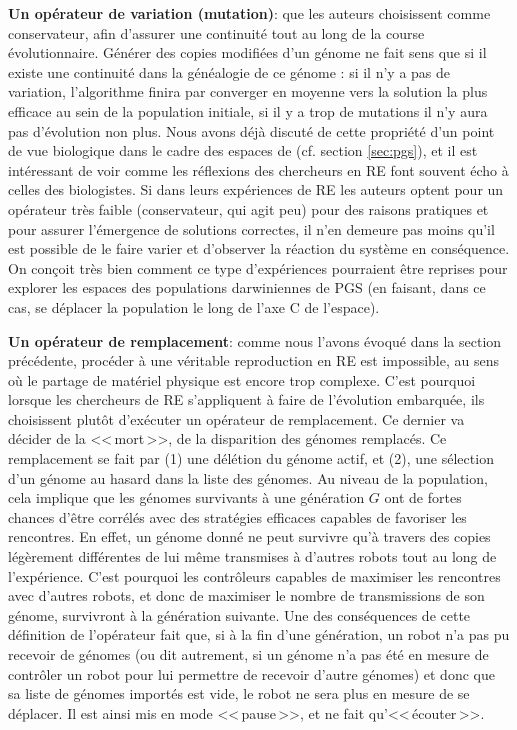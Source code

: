 \textbf{Un opérateur de variation (mutation)}: que les auteurs choisissent comme conservateur, afin d'assurer une continuité tout au long de la course évolutionnaire. Générer des copies modifiées d'un génome ne fait sens que si il existe une continuité dans la généalogie de ce génome : si il n'y a pas de variation, l'algorithme finira par converger en moyenne vers la solution la plus efficace au sein de la population initiale, si il y a trop de mutations il n'y aura pas d'évolution non plus. Nous avons déjà discuté de cette propriété d'un point de vue biologique dans le cadre des espaces de \cite{godfrey2009darwinian} (cf. section \ref{sec:pgs}), et il est intéressant de voir comme les réflexions des chercheurs en RE font souvent écho à celles des biologistes. Si dans leurs expériences de RE les auteurs optent pour un opérateur très faible (conservateur, qui agit peu) pour des raisons pratiques et pour assurer l'émergence de solutions correctes, il n'en demeure pas moins qu'il est possible de le faire varier et d'observer la réaction du système en conséquence. On conçoit très bien comment ce type d'expériences pourraient être reprises pour explorer les espaces des populations darwiniennes de PGS (en faisant, dans ce cas, se déplacer la population le long de l'axe C de l'espace).

\textbf{Un opérateur de remplacement}: comme nous l'avons évoqué dans la section précédente, procéder à une véritable reproduction en RE est impossible, au sens où le partage de matériel physique est encore trop complexe. C'est pourquoi lorsque les chercheurs de RE s'appliquent à faire de l'évolution embarquée, ils choisissent plutôt d'exécuter un opérateur de remplacement. Ce dernier va décider de la <<\,mort\,>>, de la disparition des génomes remplacés. Ce remplacement se fait par (1) une délétion du génome actif, et (2), une sélection d'un génome au hasard dans la liste des génomes. Au niveau de la population, cela implique que les génomes survivants à une génération $G$ ont de fortes chances d'être corrélés avec des stratégies efficaces capables de favoriser les rencontres. En effet, un génome donné ne peut survivre qu'à travers des copies légèrement différentes de lui même transmises à d'autres robots tout au long de l'expérience. C'est pourquoi les contrôleurs capables de maximiser les rencontres avec d'autres robots, et donc de maximiser le nombre de transmissions de son génome, survivront à la génération suivante. Une des conséquences de cette définition de l'opérateur fait que, si à la fin d'une génération, un robot n'a pas pu recevoir de génomes (ou dit autrement, si un génome n'a pas été en mesure de contrôler un robot pour lui permettre de recevoir d'autre génomes) et donc que sa liste de génomes importés est vide, le robot ne sera plus en mesure de se déplacer. Il est ainsi mis en mode <<\,pause\,>>, et ne fait qu'<<\,écouter\,>>.

